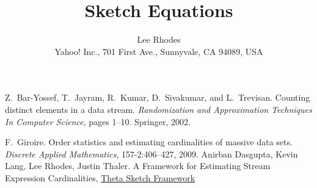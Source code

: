 \documentclass[10pt]{article}
\numberwithin{equation}{section}
\begin{document}
\title{Sketch Equations}
\author{Lee Rhodes \\
Yahoo! Inc., 701 First Ave., Sunnyvale, CA 94089, USA\\
}
\maketitle




\newpage

%
\begin{thebibliography}{99}
%
Z.~Bar-Yossef, T.~Jayram, R.~Kumar, D.~Sivakumar, and L.~Trevisan. 
Counting distinct elements in a data stream. 
{\em Randomization and Approximation Techniques In Computer Science}, 
pages 1–10. Springer, 2002.

F.~Giroire.
Order statistics and estimating cardinalities of massive data sets.
{\em Discrete Applied Mathematics}, 157-2:406--427, 2009.
%
Anirban Dasgupta, Kevin Lang, Lee Rhodes, Justin Thaler. A Framework for Estimating Stream Expression Cardinalities,
\href{http://datasketches.github.io/docs/ThetaSketchFramework.pdf}{Theta Sketch Framework}
%
\end{thebibliography}
\newpage
\appendix

\end{document}

